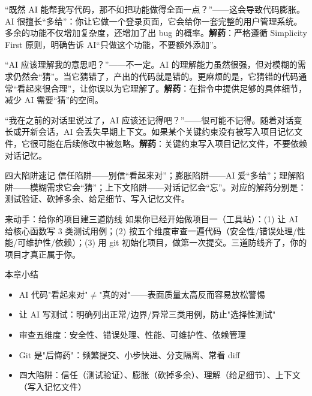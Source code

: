 “既然 AI 能帮我写代码，那不如把功能做得全面一点？”——这会导致代码膨胀。AI 很擅长“多给”：你让它做一个登录页面，它会给你一套完整的用户管理系统。多余的功能不仅增加复杂度，还增加了出 bug 的概率。\textbf{解药}：严格遵循 Simplicity First 原则，明确告诉 AI“只做这个功能，不要额外添加”。


“AI 应该理解我的意思吧？”——不一定。AI 的理解能力虽然很强，但对模糊的需求仍然会“猜”。当它猜错了，产出的代码就是错的。更麻烦的是，它猜错的代码通常“看起来很合理”，让你误以为它理解了。\textbf{解药}：在指令中提供足够的具体细节，减少 AI 需要“猜”的空间。


“我在之前的对话里说过了，AI 应该还记得吧？”——很可能不记得。随着对话变长或开新会话，AI 会丢失早期上下文。如果某个关键约束没有被写入项目记忆文件，它很可能在后续修改中被忽略。\textbf{解药}：关键约束写入项目记忆文件，不要依赖对话记忆。

\begin{tcbwarn}{四大陷阱速记}
信任陷阱——别信“看起来对”；膨胀陷阱——AI 爱“多给”；理解陷阱——模糊需求它会“猜”；上下文陷阱——对话记忆会“忘”。对应的解药分别是：测试验证、砍掉多余、给足细节、写入记忆文件。

\end{tcbwarn}

\begin{tcbpractice}{来动手：给你的项目建三道防线}
如果你已经开始做项目一（工具站）：(1) 让 AI 给核心函数写 3 类测试用例；(2) 按五个维度审查一遍代码（安全性/错误处理/性能/可维护性/依赖）；(3) 用 git 初始化项目，做第一次提交。三道防线齐了，你的项目才真正属于你。

\end{tcbpractice}

\begin{tcbsummary}{本章小结}
\begin{itemize}
  \item AI 代码"看起来对"$\neq$"真的对"——表面质量太高反而容易放松警惕
  \item 让 AI 写测试：明确列出正常/边界/异常三类用例，防止"选择性测试"
  \item 审查五维度：安全性、错误处理、性能、可维护性、依赖管理
  \item Git 是"后悔药"：频繁提交、小步快进、分支隔离、常看 diff
  \item 四大陷阱：信任（测试验证）、膨胀（砍掉多余）、理解（给足细节）、上下文（写入记忆文件）
\end{itemize}

\end{tcbsummary}
